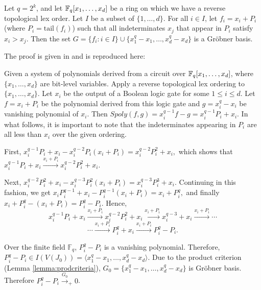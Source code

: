 \begin{Theorem}
\label{thm:lvcontrib}
Let $q = 2^k$, and let ${\mathbb{F}}_{q}[x_1, \ldots, x_d]$ be a ring on
which we have a reverse topological lex order. Let $I$ be a subset of $\{1,
\ldots, d\}$. For all $i \in I$, let $f_i = x_i +P_i$ (where $P_i =
\text{tail}(f_i)$) such that  all indeterminates $x_j$  that appear in
$P_i$ satisfy $x_i > x_j$.  Then the set $G = \{f_i :  i  \in I\} \cup
\{x_1^q-x_1, \ldots, x_d^q-x_d\}$ is a Gr\"obner basis. 
\end{Theorem}

The proof is given in \cite{lv:phd} and is reproduced here:

\begin{Proof}
Given a system of polynomials derived from a circuit over 
${\mathbb{F}}_{q}[x_1, \ldots, x_d]$, where $\{x_1,\dots,x_d\}$ are bit-level variables.
Apply a reverse topological lex ordering to $\{x_1,\dots,x_d\}$. 
Let $x_i$ be the output of a Boolean logic gate for some $1\leq i \leq d$.
Let $f = x_i + P_i$ be the polynomial derived from this logic gate and
$g = x_i^q-x_i$ be vanishing polynomial of $x_i$.
Then $Spoly(f,g)=
x_i^{q-1} f - g = x_i^{q-1}P_i + x_i$. In what follows, it is important
to note that the indeterminates appearing in $P_i$ are all less than
$x_i$ over the given ordering.  

First,  $x_i^{q-1}P_i +x_i - x_i^{q-2}P_i(x_i+P_i)=x_i^{q-2}P_i^2 +x_i,$ 
which shows that 
$x_i^{q-1}P_i +x_i \stackrel{x_i+P_i}{\longrightarrow}  x_i^{q-2}P_i^2
+x_i.$  

Next, $x_i^{q-2}P_i^2 + x_i - x_i^{q-3}P_i^2(x_i+P_i)=
x_i^{q-3}P_i^3+ x_i.$ Continuing in this fashion, we get $x_iP_i^{q-1}
+x_i-P_i^{q-1}(x_i+P_i) = x_i + P_i^q,$ and finally 
$x_i+P_i^q -(x_i+P_i) = P_i^q-P_i.$ Hence, 
$$x_i^{q-1}P_i +x_i \stackrel{x_i+P_i}{\longrightarrow} x_i^{q-2}P_i^2
+x_i \stackrel{x_i+P_i}{\longrightarrow} x_i^{q-3}
+x_i \stackrel{x_i+P_i}{\longrightarrow} \cdots$$
$$\cdots \stackrel{x_i+P_i}{\longrightarrow}
P_i^q+x_i\stackrel{x_i+P_i}{\longrightarrow} P_i^q-P_i.$$ 


Over the finite field $\mathbb{F}_{q}$, $P_i^q-P_i$ is a vanishing
polynomial. Therefore, $P_i^q-P_i \in I(V(J_0))= \langle
x_1^q-x_1, \ldots, x_d^q-x_d\rangle$. Due to the product criterion
(Lemma \ref{lemma:prodcriteria}), $G_0=\{x_1^q-x_1, \ldots, x_d^q-x_d\}$ is
Gr\"obner basis. Therefore 
$P_i^q-P_i \stackrel{G_0}\rightarrow_+ 0$. 
\end{Proof}

